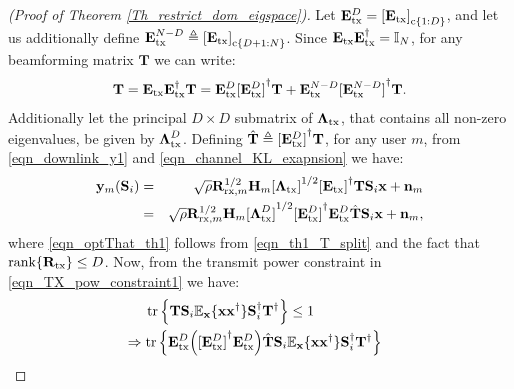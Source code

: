 \documentclass[journal,comsoc]{IEEEtran}
\begin{document}
\begin{appendices}
\section{} \label{appdix1}
%
%
\begin{proof}[(Proof of Theorem \ref{Th_restrict_dom_eigspace})]
Let $\mathbf{E}_{\rm tx}^D = {[\mathbf{E}_{\rm tx}]}_{{\rm c}\{1:D\}}$, and let us additionally define $\mathbf{E}_{\rm tx}^{N-D} \triangleq {[\mathbf{E}_{\rm tx}]}_{{\rm c}\{D+1:N\}}$. Since $\mathbf{E}_{\rm tx} \mathbf{E}_{\rm tx}^{\dag} = \mathbb{I}_N$, for any beamforming matrix $\mathbf{T}$ we can write:
\begin{eqnarray} \label{eqn_th1_T_split}
\mathbf{T} = \mathbf{E}_{\rm tx} \mathbf{E}_{\rm tx}^{\dag} \mathbf{T} = \mathbf{E}_{\rm tx}^{D} {[\mathbf{E}_{\rm tx}^{D}]}^{\dag} \mathbf{T} + \mathbf{E}_{\rm tx}^{N-D} {[\mathbf{E}_{\rm tx}^{N-D}]}^{\dag} \mathbf{T}.
\end{eqnarray}
Additionally let the principal $D \times D$ submatrix of $\boldsymbol{\Lambda}_{\rm tx}$, that contains all non-zero eigenvalues, be given by $\boldsymbol{\Lambda}^{D}_{\rm tx}$. Defining $\hat{\mathbf{T}} \triangleq {[\mathbf{E}_{\rm tx}^D]}^{\dag} \mathbf{T}$, for any user $m$, from \eqref{eqn_downlink_y1} and \eqref{eqn_channel_KL_exapnsion} we have:
\begin{eqnarray}
\mathbf{y}_m(\mathbf{S}_i) &=& \sqrt{\rho} \mathbf{R}_{{\rm rx},m}^{1/2} \mathbf{H}_m {[\boldsymbol{\Lambda}_{\rm tx}]}^{1/2} {[\mathbf{E}_{\rm tx}]}^{\dag} \mathbf{T} \mathbf{S}_i \mathbf{x} + \mathbf{n}_m \nonumber \\
&=& \sqrt{\rho} \mathbf{R}_{{\rm rx},m}^{1/2} \mathbf{H}_m {[\boldsymbol{\Lambda}^D_{\rm tx}]}^{1/2} {[\mathbf{E}^D_{\rm tx}]}^{\dag} \mathbf{E}_{\rm tx}^{D} \hat{\mathbf{T}} \mathbf{S}_i \mathbf{x} + \mathbf{n}_m, \label{eqn_optThat_th1}
\end{eqnarray}
where \eqref{eqn_optThat_th1} follows from \eqref{eqn_th1_T_split} and the fact that $\text{rank}\{\mathbf{R}_{\rm tx}\} \leq D$. Now, from the transmit power constraint in \eqref{eqn_TX_pow_constraint1} we have:
\begin{subequations}
\begin{flalign}
& \quad \ \ \text{tr} \left\{ \mathbf{T}\mathbf{S}_i \mathbb{E}_{\mathbf{x}}\{\mathbf{x} \mathbf{x}^{\dag}\} \mathbf{S}_i^{\dag} \mathbf{T}^{\dag} \right\} \leq 1 & \nonumber \\
& \Rightarrow \text{tr} \left\{ \mathbf{E}_{\rm tx}^D \Big( {[\mathbf{E}_{\rm tx}^D]}^{\dag} \mathbf{E}_{\rm tx}^D \Big) \hat{\mathbf{T}} \mathbf{S}_i \mathbb{E}_{\mathbf{x}}\{\mathbf{x} \mathbf{x}^{\dag}\} \mathbf{S}_i^{\dag} \mathbf{T}^{\dag}  \right\} & \nonumber \\

\end{flalign}
\end{subequations}
\end{proof}
\end{appendices}
\end{document}
